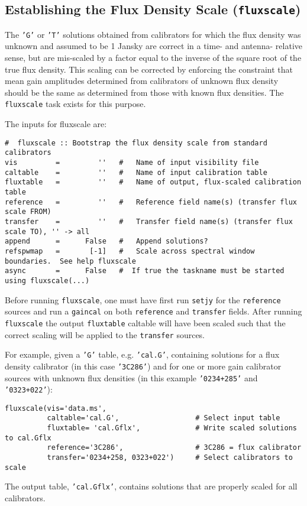 \subsection{Establishing the Flux Density Scale ({\tt fluxscale}) }
\label{section:cal.solve.fluxscale}

The {\tt 'G'} or {\tt 'T'} solutions obtained from calibrators for
which the flux 
density was unknown and assumed to be 1 Jansky are correct in a time- and
antenna- relative sense, but are mis-scaled by a factor equal to the
inverse of the square root of the true flux density.  This scaling can
be corrected by enforcing the constraint that mean gain amplitudes
determined from calibrators of unknown flux density should be the same
as determined from those with known flux densities.  The {\tt
fluxscale} task exists for this purpose.  

The inputs for fluxscale are:
\small
\begin{verbatim}
#  fluxscale :: Bootstrap the flux density scale from standard calibrators
vis         =         ''   #   Name of input visibility file
caltable    =         ''   #   Name of input calibration table
fluxtable   =         ''   #   Name of output, flux-scaled calibration table
reference   =         ''   #   Reference field name(s) (transfer flux scale FROM)
transfer    =         ''   #   Transfer field name(s) (transfer flux scale TO), '' -> all
append      =      False   #   Append solutions?
refspwmap   =       [-1]   #   Scale across spectral window boundaries.  See help fluxscale
async       =      False   #  If true the taskname must be started using fluxscale(...)
\end{verbatim}
\normalsize

Before running {\tt fluxscale}, one must have first run {\tt setjy} for the
{\tt reference} sources and run a {\tt gaincal} on both {\tt reference}
and {\tt transfer} fields.  After running {\tt fluxscale} the output
{\tt fluxtable} caltable will have been scaled such that the correct
scaling will be applied to the {\tt transfer} sources.

For example, given a {\tt 'G'} table, e.g. {\tt 'cal.G'},
containing solutions for a flux density calibrator (in this case 
{\tt '3C286'}) and for one or more gain calibrator sources with
unknown flux densities (in this example {\tt '0234+285'} and 
{\tt '0323+022'}):
\small
\begin{verbatim}
fluxscale(vis='data.ms',
          caltable='cal.G',                  # Select input table
          fluxtable= 'cal.Gflx',             # Write scaled solutions to cal.Gflx
          reference='3C286',                 # 3C286 = flux calibrator
          transfer='0234+258, 0323+022')     # Select calibrators to scale
\end{verbatim}
\normalsize
The output table, {\tt 'cal.Gflx'}, contains solutions that are properly scaled
for all calibrators.

